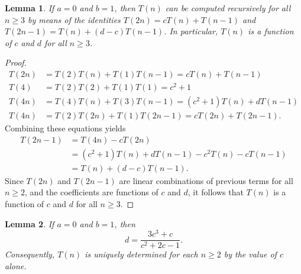 \documentclass[11pt,fleqn]{amsart}
\newtheorem{lemma}{Lemma}
\begin{document}
\begin{lemma}
If $a = 0$ and $b = 1$, then $T(n)$ can be computed recursively for all $n \ge 3$ by means of the identities
$T(2n) = c T(n) + T(n-1)$ and $T(2n-1) = T(n) + (d-c) T(n-1)$. In particular, $T(n)$ is a function of $c$ and $d$
for all $n\ge 3$.
\end{lemma}
\begin{proof}
\begin{align*}
T(2n) &= T(2) T(n) + T(1) T(n-1) = c T(n) + T(n-1) \\
T(4) &= T(2) T(2) + T(1) T(1) = c^2 + 1 \\
T(4n) &= T(4) T(n) + T(3) T(n-1) = (c^2 + 1) T(n) + dT(n-1) \\
T(4n) &= T(2) T(2n) + T(1) T(2n-1) = cT(2n) + T(2n-1).
\end{align*}
Combining these equations yields
\begin{align*}
T(2n-1) &= T(4n) - cT(2n) \\
             &= (c^2+1) T(n) + d T(n-1) - c^2 T(n) - cT(n-1) \\
             &= T(n) + (d-c) T(n-1).
\end{align*}
Since $T(2n)$ and $T(2n-1)$ are linear combinations of previous terms for all $n \ge 2$,
and the coefficients are functions of $c$ and $d$, it follows that $T(n)$ is a function of $c$ and $d$
for all $n \ge 3$.
\end{proof}

\begin{lemma} If $a = 0$ and $b = 1$, then 
$$d = \frac{3c^3 + c}{c^2+2c-1}.$$
Consequently, $T(n)$ is uniquely determined for each $n \ge 2$ by the value of $c$ alone.
\end{lemma}
\end{document}
